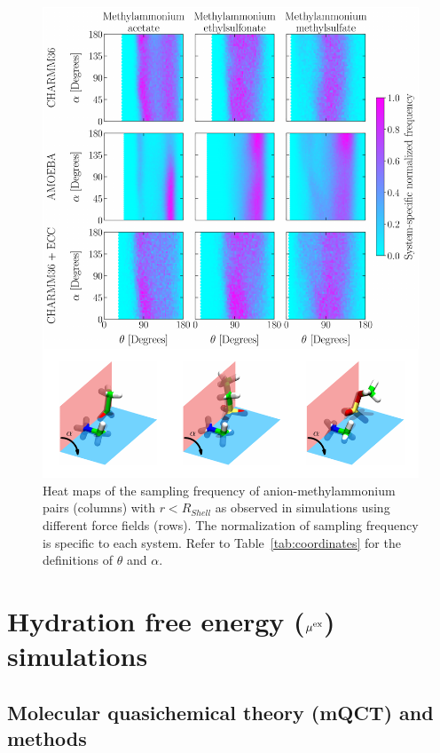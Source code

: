 \documentclass[journal=jacsat,articletitle=true,manuscript=suppinfo,layout=onecolumn]{achemso}
\begin{document}
    \begin{figure}[H]
    \begin{center}
        \includegraphics[width=\columnwidth]{images/fig_hexmaps_mamm.pdf}
        \caption{Heat maps of the sampling frequency of anion-methylammonium pairs (columns) with $r < R_{Shell}$ as observed in simulations using different force fields (rows). The normalization of sampling frequency is specific to each system. Refer to Table~\ref{tab:coordinates} for the definitions of $\theta$ and $\alpha$.}
        \label{fig:heatmap_mamm}
    \end{center}
    \end{figure}





    \section{Hydration free energy ($\mu^{\rm{ex}}$) simulations}
    \subsection{Molecular quasichemical theory (mQCT) and methods}
\end{document}
